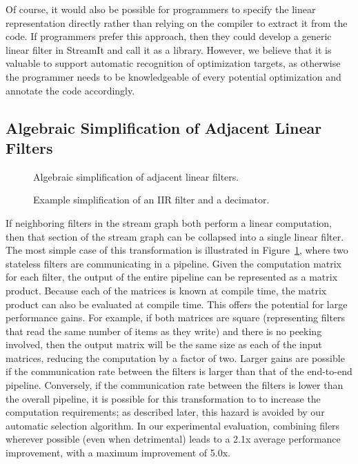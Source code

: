 Of course, it would also be possible for programmers to specify the
linear representation directly rather than relying on the compiler to
extract it from the code.  If programmers prefer this approach, then
they could develop a generic linear filter in StreamIt and call it as
a library.  However, we believe that it is valuable to support
automatic recognition of optimization targets, as otherwise the
programmer needs to be knowledgeable of every potential optimization
and annotate the code accordingly.

\subsection*{Algebraic Simplification of Adjacent Linear Filters}

\begin{figure}[t]
\caption{Algebraic simplification of adjacent linear filters.\protect\label{fig:combination}}
\end{figure}

\begin{figure}[t]
\caption{Example simplification of an IIR filter and a decimator.\protect\label{fig:combination-example}}
\end{figure}

If neighboring filters in the stream graph both perform a linear
computation, then that section of the stream graph can be collapsed
into a single linear filter.  The most simple case of this
transformation is illustrated in Figure~\ref{fig:combination}, where
two stateless filters are communicating in a pipeline.  Given the
computation matrix for each filter, the output of the entire pipeline
can be represented as a matrix product.  Because each of the matrices
is known at compile time, the matrix product can also be evaluated at
compile time.  This offers the potential for large performance gains.
For example, if both matrices are square (representing filters that
read the same number of items as they write) and there is no peeking
involved, then the output matrix will be the same size as each of the
input matrices, reducing the computation by a factor of two.  Larger
gains are possible if the communication rate between the filters is
larger than that of the end-to-end pipeline.  Conversely, if the
communication rate between the filters is lower than the overall
pipeline, it is possible for this transformation to to increase the
computation requirements; as described later, this hazard is avoided
by our automatic selection algorithm.  In our experimental evaluation,
combining filers wherever possible (even when detrimental) leads to a
2.1x average performance improvement, with a maximum improvement of
5.0x.

